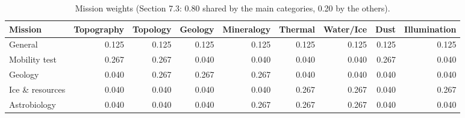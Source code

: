 \begin{table}[ht]
\centering\small
\caption{Mission weights (Section 7.3: 0.80 shared by the main categories, 0.20 by the others).}
\label{tab:weights}
\begin{tabular}{lrrrrrrrr}
\hline
Mission & Topography & Topology & Geology & Mineralogy & Thermal & Water/Ice & Dust & Illumination \\
\hline
General & 0.125 & 0.125 & 0.125 & 0.125 & 0.125 & 0.125 & 0.125 & 0.125 \\
Mobility test & 0.267 & 0.267 & 0.040 & 0.040 & 0.040 & 0.040 & 0.267 & 0.040 \\
Geology & 0.040 & 0.267 & 0.267 & 0.267 & 0.040 & 0.040 & 0.040 & 0.040 \\
Ice \& resources & 0.040 & 0.040 & 0.040 & 0.040 & 0.267 & 0.267 & 0.040 & 0.267 \\
Astrobiology & 0.040 & 0.040 & 0.040 & 0.267 & 0.267 & 0.267 & 0.040 & 0.040 \\
\hline
\end{tabular}
\end{table}